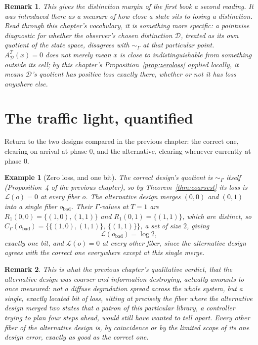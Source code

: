 \documentclass[11pt]{report}
\newtheorem{remark}{Remark}[chapter]
\newtheorem{example}{Example}[chapter]
\begin{document}
\begin{remark}
This gives the distinction margin of the first book a second reading.
It was introduced there as a measure of how close a state sits to
losing a distinction. Read through this chapter's vocabulary, it is
something more specific: a pointwise diagnostic for whether the
observer's chosen distinction $\mathcal{D}$, treated as its own
quotient of the state space, disagrees with $\sim_\Gamma$ at that
particular point. $A_{\mathcal D}^T(x) = 0$ does not merely mean $x$
is close to indistinguishable from something outside its cell; by
this chapter's Proposition~\ref{prop:zeroloss} applied locally, it
means $\mathcal D$'s quotient has positive loss exactly there,
whether or not it has loss anywhere else.
\end{remark}

\section*{The traffic light, quantified}

Return to the two designs compared in the previous chapter: the
correct one, clearing on arrival at phase $0$, and the alternative,
clearing whenever currently at phase $0$.

\begin{example}[Zero loss, and one bit]
The correct design's quotient is $\sim_\Gamma$ itself (Proposition~4
of the previous chapter), so by Theorem~\ref{thm:coarsest} its loss is
$\mathcal{L}(o) = 0$ at every fiber $o$. The alternative design merges
$(0,0)$ and $(0,1)$ into a single fiber $o_{\mathrm{bad}}$. Their
$\Gamma$-values at $T=1$ are $R_1(0,0) = \{(1,0),(1,1)\}$ and
$R_1(0,1) = \{(1,1)\}$, which are distinct, so
$C_\Gamma(o_{\mathrm{bad}}) = \{\{(1,0),(1,1)\},\ \{(1,1)\}\}$, a set
of size $2$, giving
\[
\mathcal{L}(o_{\mathrm{bad}}) = \log 2,
\]
exactly one bit, and $\mathcal{L}(o) = 0$ at every other fiber, since
the alternative design agrees with the correct one everywhere except
at this single merge.
\end{example}

\begin{remark}
This is what the previous chapter's qualitative verdict, that the
alternative design was coarser and information-destroying, actually
amounts to once measured: not a diffuse degradation spread across the
whole system, but a single, exactly located bit of loss, sitting at
precisely the fiber where the alternative design merged two states
that a patron of this particular library, a controller trying to
plan four steps ahead, would still have wanted to tell apart. Every
other fiber of the alternative design is, by coincidence or by the
limited scope of its one design error, exactly as good as the correct
one.
\end{remark}
\end{document}
